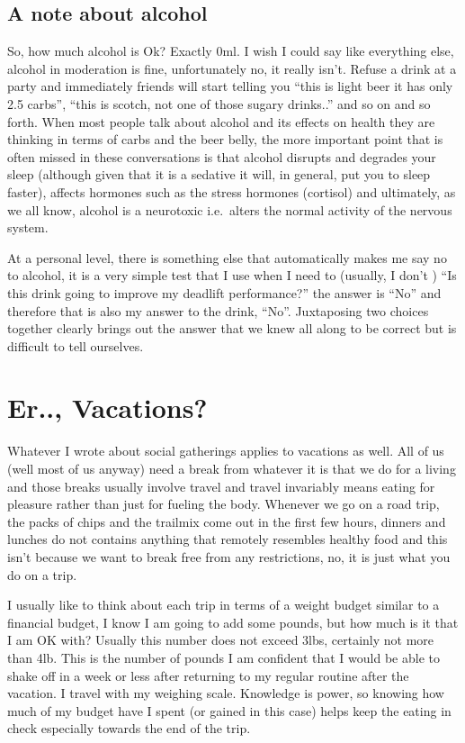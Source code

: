 \documentclass[
  oneside]{book}
\begin{document}
\hypertarget{a-note-about-alcohol}{%
\subsection{A note about alcohol}\label{a-note-about-alcohol}}

So, how much alcohol is Ok? Exactly 0ml. I wish I could say like everything else, alcohol in moderation is fine, unfortunately no, it really isn't. Refuse a drink at a party and immediately friends will start telling you ``this is light beer it has only 2.5 carbs'', ``this is scotch, not one of those sugary drinks..'' and so on and so forth. When most people talk about alcohol and its effects on health they are thinking in terms of carbs and the beer belly, the more important point that is often missed in these conversations is that alcohol disrupts and degrades your sleep (although given that it is a sedative it will, in general, put you to sleep faster), affects hormones such as the stress hormones (cortisol) and ultimately, as we all know, alcohol is a neurotoxic i.e.~alters the normal activity of the nervous system.

At a personal level, there is something else that automatically makes me say no to alcohol, it is a very simple test that I use when I need to (usually, I don't ) ``Is this drink going to improve my deadlift performance?'' the answer is ``No'' and therefore that is also my answer to the drink, ``No''. Juxtaposing two choices together clearly brings out the answer that we knew all along to be correct but is difficult to tell ourselves.

\hypertarget{er..-vacations}{%
\section{Er.., Vacations?}\label{er..-vacations}}

Whatever I wrote about social gatherings applies to vacations as well. All of us (well most of us anyway) need a break from whatever it is that we do for a living and those breaks usually involve travel and travel invariably means eating for pleasure rather than just for fueling the body. Whenever we go on a road trip, the packs of chips and the trailmix come out in the first few hours, dinners and lunches do not contains anything that remotely resembles healthy food and this isn't because we want to break free from any restrictions, no, it is just what you do on a trip.

I usually like to think about each trip in terms of a weight budget similar to a financial budget, I know I am going to add some pounds, but how much is it that I am OK with? Usually this number does not exceed 3lbs, certainly not more than 4lb. This is the number of pounds I am confident that I would be able to shake off in a week or less after returning to my regular routine after the vacation. I travel with my weighing scale. Knowledge is power, so knowing how much of my budget have I spent (or gained in this case) helps keep the eating in check especially towards the end of the trip.
\end{document}
